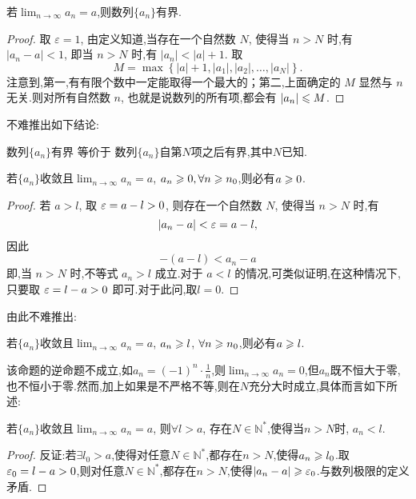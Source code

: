 \begin{proposition}[有界性]
    若$\lim_{n \to \infty} a_n=a$,则数列$\{a_n\}$有界.
\end{proposition}

\begin{proof}
    取 $\varepsilon = 1$, 由定义知道,当存在一个自然数 $N$, 使得当 $n > N$ 时,有 $|a_n - a| < 1$, 即当 $n > N$ 时,有 $|a_n| < |a| + 1$. 取
    $$
        M = \max \left\{ |a| + 1, |a_1|, |a_2|, \dots, |a_N| \right\}.
    $$
    注意到,第一,有有限个数中一定能取得一个最大的；第二,上面确定的 $M$ 显然与 $n$ 无关.则对所有自然数 $n$, 也就是说数列的所有项,都会有 $|a_n| \leqslant M$.
\end{proof}

不难推出如下结论:
\begin{proposition*}
    数列$\{a_n\}$有界 等价于 数列$\{a_n\}$自第$N$项之后有界,其中$N$已知.
\end{proposition*}

\begin{proposition}
    [保号性] 若$\{a_n\}$收敛且$\lim_{n \to \infty} a_n = a$, $a_n \geqslant 0,\forall n \geqslant n_0$,则必有$a\geqslant 0$.
\end{proposition}

\begin{proof}
    若 $a > l$, 取 $\varepsilon = a - l > 0$, 则存在一个自然数 $N$, 使得当 $n > N$ 时,有
    $$|a_n - a| < \varepsilon = a - l, $$
    因此
    $$- (a - l) < a_n - a$$
    即,当 $n > N$ 时,不等式 $a_n > l$ 成立.对于 $a < l$ 的情况,可类似证明,在这种情况下,只要取 $\varepsilon = l - a > 0$ 即可.对于此问,取$l = 0$.
\end{proof}

由此不难推出:
\begin{proposition*}
    若$\{a_n\}$收敛且$\lim_{n \to \infty} a_n = a$, $a_n \geqslant l$, $\forall n \geqslant n_0$,则必有$a\geqslant l$.
\end{proposition*}

该命题的逆命题不成立,如$a_n = (-1)^n \cdot \frac{1}{n}$,则$\lim_{n \to \infty} a_n = 0$,但$a_n$既不恒大于零,也不恒小于零.然而,加上如果是不严格不等,则在$N$充分大时成立,具体而言如下所述:
\begin{proposition*}
    若$\{a_n\}$收敛且$\lim_{n \to \infty} a_n = a$, 则$\forall l > a$, 存在$N \in \mathbb{N}^*$,使得当$n > N$时, $a_n < l$.
\end{proposition*}

\begin{proof}
    反证:若$\exists l_0 > a$,使得对任意$N \in \mathbb{N}^*$,都存在$n > N$,使得$a_n \geqslant l_0$.取$\varepsilon_0 = l - a > 0$,则对任意$N \in \mathbb{N}^*$,都存在$n > N$,使得$|a_n - a| \geqslant \varepsilon_0$.与数列极限的定义矛盾.
\end{proof}

